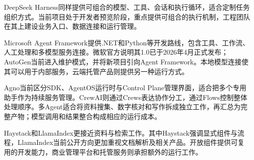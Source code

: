 DeepSeek Harness同样提供可组合的模型、工具、会话和执行循环，适合定制任务组织方式。当前项目处于开发者预览阶段，重点提供可组合的执行机制，工程团队在其上建设业务入口、数据连接和运行管理。

Microsoft Agent Framework提供.NET和Python等开发路线，包含工具、工作流、人工处理和多模型服务连接。微软官方说明其1.0已于2026年4月正式发布；AutoGen当前进入维护模式，并将新项目引向Agent Framework。本地模型连接使其可以用于内部服务，云端托管产品则提供另一种运行方式。

Agno当前区分SDK、AgentOS运行时与Control Plane管理界面，适合把多个专用助手作为持续服务管理。CrewAI则通过Crews表达协作分工，通过Flows控制整体处理顺序。多Agent适合将资料搜集、数字核对和写作拆成独立工作，再汇总为完整产物；模型调用和结果整合构成相应的运行成本。

Haystack和LlamaIndex更接近资料与检索工作。其中Haystack强调显式组件与流程，LlamaIndex当前公开方向更加重视文档解析及相关产品。开放组件提供可复用的开发能力，商业管理平台和托管服务则承担额外的运行工作。

